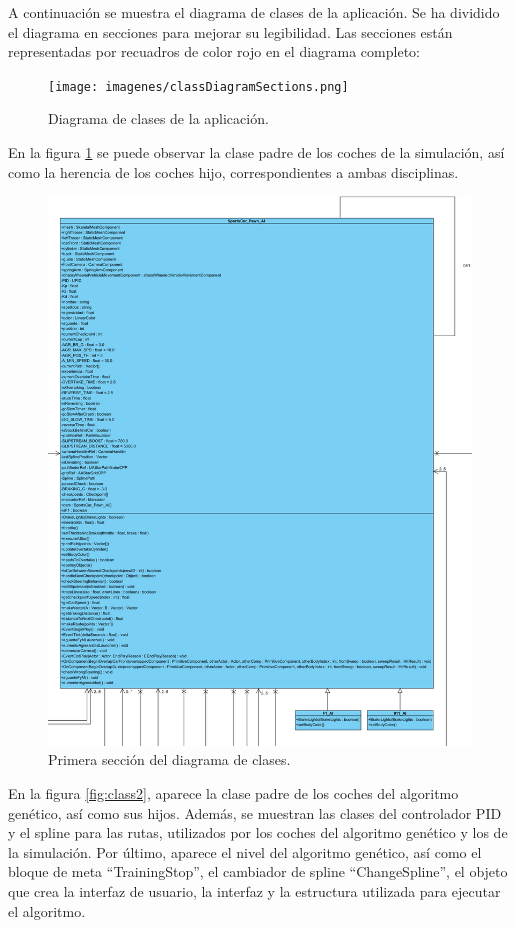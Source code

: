 A continuación se muestra el diagrama de clases de la aplicación. Se ha dividido el diagrama en secciones para mejorar su legibilidad. Las secciones están representadas por recuadros de color rojo en el diagrama completo:

\begin{figure}[H]
    \centering
    \texttt{[image: imagenes/classDiagramSections.png]}
    \caption{Diagrama de clases de la aplicación.}
\end{figure}


En la figura \ref{fig:class1} se puede observar la clase padre de los coches de la simulación, así como la herencia de los coches hijo, correspondientes a ambas disciplinas.
\begin{figure}[H]
    \centering
    \includegraphics[width=\textwidth]{imagenes/classDiagram1.png}
    \caption{Primera sección del diagrama de clases.}
    \label{fig:class1}
\end{figure}


En la figura \ref{fig:class2}, aparece la clase padre de los coches del algoritmo genético, así como sus hijos. Además, se muestran las clases del controlador PID y el spline para las rutas, utilizados por los coches del algoritmo genético y los de la simulación. Por último, aparece el nivel del algoritmo genético, así como el bloque de meta ``TrainingStop'', el cambiador de spline ``ChangeSpline'', el objeto que crea la interfaz de usuario, la interfaz y la estructura utilizada para ejecutar el algoritmo.

